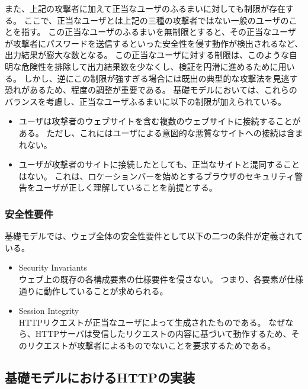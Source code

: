 \documentclass[12pt,a4paper]{jbook}
\begin{document}
また、上記の攻撃者に加えて正当なユーザのふるまいに対しても制限が存在する。
\color{red}
ここで、正当なユーザとは上記の三種の攻撃者ではない一般のユーザのことを指す。
この正当なユーザのふるまいを無制限とすると、その正当なユーザが攻撃者にパスワードを送信するといった安全性を侵す動作が検出されるなど、出力結果が膨大な数となる。
この正当なユーザに対する制限は、このような自明な危険性を排除して出力結果数を少なくし、検証を円滑に進めるために用いる。
\color{black}
しかし、逆にこの制限が強すぎる場合には既出の典型的な攻撃法を見逃す恐れがあるため、程度の調整が重要である。
基礎モデルにおいては、これらのバランスを考慮し、正当なユーザふるまいに以下の制限が加えられている。
\begin{itemize}
\item ユーザは攻撃者のウェブサイトを含む複数のウェブサイトに接続することがある。
ただし、これにはユーザによる意図的な悪質なサイトへの接続は含まれない。
\item ユーザが攻撃者のサイトに接続したとしても、正当なサイトと混同することはない。
これは、ロケーションバーを始めとするブラウザのセキュリティ警告をユーザが正しく理解していることを前提とする。
\end{itemize}

\subsubsection{安全性要件}
基礎モデルでは、ウェブ全体の安全性要件として以下の二つの条件が定義されている。
\begin{itemize}
\item Security Invariants\\
ウェブ上の既存の各構成要素の仕様要件を侵さない。
つまり、各要素が仕様通りに動作していることが求められる。
\item Session Integrity\\
HTTPリクエストが正当なユーザによって生成されたものである。
なぜなら、HTTPサーバは受信したリクエストの内容に基づいて動作するため、そのリクエストが攻撃者によるものでないことを要求するためである。
\end{itemize}

\subsection{基礎モデルにおけるHTTPの実装}
\label{sec:based-model-http}
\end{document}
